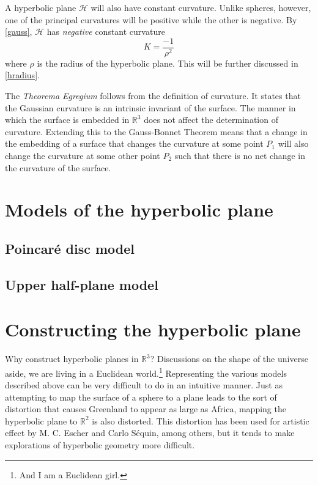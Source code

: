 \documentclass[letterpaper,titlepage]{article}
\newcommand{\esp}{$\mathbb{R}^3$}
\begin{document}
A hyperbolic plane $\mathcal{H}$ will also have constant curvature.
Unlike spheres, however, one of the principal curvatures will be positive while the other is negative.
By \eqref{gauss}, $\mathcal{H}$ has \emph{negative} constant curvature
\begin{equation}
K = \frac{-1}{\rho^2}
\label{hcurve}
\end{equation}
where $\rho$ is the radius of the hyperbolic plane. This will be further discussed in \ref{hradius}.

The \emph{Theorema Egregium} follows from the definition of curvature.
It states that the Gaussian curvature is an intrinsic invariant of the surface.\cite{gauss}
The manner in which the surface is embedded in $\mathbb{R}^3$ does not affect the determination of curvature.
Extending this to the Gauss-Bonnet Theorem means that a change in the embedding of a surface that changes the curvature at some point $P_1$ will also change the curvature at some other point $P_2$ such that there is no net change in the curvature of the surface.\cite{makingmath}

\section{Models of the hyperbolic plane}
\subsection{Poincar\'e disc model}
\subsection{Upper half-plane model}

\section{Constructing the hyperbolic plane}
Why construct hyperbolic planes in \esp?
Discussions on the shape of the universe aside, we are living in a Euclidean world.\footnote{And I am a Euclidean girl.\cite{madonna}}
Representing the various models described above can be very difficult to do in an intuitive manner.
Just as attempting to map the surface of a sphere to a plane leads to the sort of distortion that causes Greenland to appear as large as Africa, mapping the hyperbolic plane to $\mathbb{R}^2$ is also distorted.\cite{makingmath}
This distortion has been used for artistic effect by M. C. Escher and Carlo S\'equin, among others, but it tends to make explorations of hyperbolic geometry more difficult.\cite{adventures}
\end{document}
